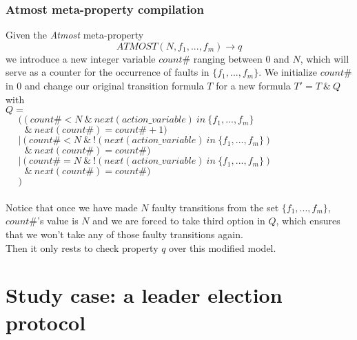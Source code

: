 \documentclass[12pt]{llncs2e/llncs}
\begin{document}
\subsubsection*{Atmost meta-property compilation}
Given the \textit{Atmost} meta-property $$ATMOST(N,f_1,...,f_m) \rightarrow q$$ we introduce a new integer variable $count\#$ ranging between $0$ and $N$, which will serve as a counter for the occurrence of faults in $\{f_1,...,f_m\}$. We initialize $count\#$ in $0$ and change our original transition formula $T$ for a new formula $T' = T~\&~Q$ with\\
$Q = $\\ 
$~~~~~~(~(~count\# < N~\&~next(action\_variable)~in~\{f_1,...,f_m\}$\\
$~~~~~~~~~\&~next(count\#)=count\#+1)$\\
$~~~~~~|~(~count\# < N~\&~!(next(action\_variable)~in~\{f_1,...,f_m\})$\\
$~~~~~~~~~\&~next(count\#)=count\#)$\\
$~~~~~~|~(~count\# = N~\&~!(next(action\_variable)~in~\{f_1,...,f_m\})$\\
$~~~~~~~~~\&~next(count\#)=count\#)$\\
$~~~~~~)$\\\\
Notice that once we have made $N$ faulty transitions from the set $\{f_1,...,f_m\}$, $count\#$'s value is $N$ and we are forced to take third option in $Q$, which ensures that we won't take any of those faulty transitions again.\\
Then it only rests to check property $q$ over this modified model.

\section{Study case: a leader election protocol}
\end{document}
